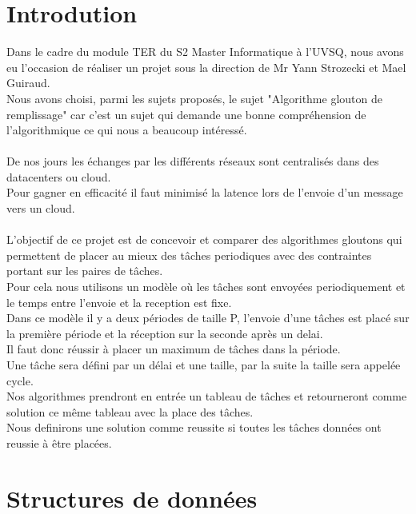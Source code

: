 \documentclass[11pt]{article}
\title{\vspace{13em}{\huge TER}}
\author{Rémi Navarro - 21401257\\ Edouard Fouassier - 21400750}
\begin{document}
\clearpage
\maketitle\vspace{13em}
\newpage
\tableofcontents
\newpage
\clearpage
{}
\section{Introdution}
Dans le cadre du module TER du S2 Master Informatique à l’UVSQ, nous avons eu l’occasion de réaliser un projet sous la direction de Mr Yann Strozecki et Mael Guiraud.\\
Nous avons choisi, parmi les sujets proposés, le sujet "Algorithme glouton de remplissage" car c'est un sujet qui demande une bonne compréhension de l'algorithmique ce qui nous a beaucoup intéressé.\\\\
De nos jours les échanges par les différents réseaux sont centralisés dans des datacenters ou cloud.\\
Pour gagner en efficacité il faut minimisé la latence lors de l'envoie d'un message vers un cloud.\\\\
L'objectif de ce projet est de concevoir et comparer des algorithmes gloutons qui permettent de placer au mieux des tâches periodiques avec des contraintes portant sur les paires de tâches.\\
Pour cela nous utilisons un modèle où les tâches sont envoyées periodiquement et le temps entre l'envoie et la reception est fixe.\\
Dans ce modèle il y a deux périodes de taille P, l'envoie d'une tâches est placé sur la première période et la réception sur la seconde après un delai.\\
Il faut donc réussir à placer un maximum de tâches dans la période.\\
Une tâche sera défini par un délai et une taille, par la suite la taille sera appelée cycle.\\
Nos algorithmes prendront en entrée un tableau de tâches et retourneront comme solution ce même tableau avec la place des tâches.\\
Nous definirons une solution comme reussite si toutes les tâches données ont reussie à être placées.\\

\newpage
\section{Structures de données}
\end{document}
